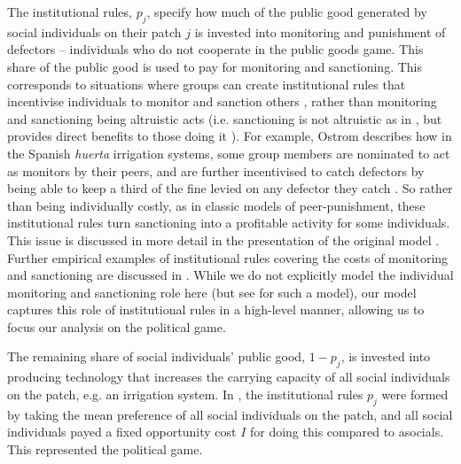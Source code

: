 \documentclass{rstb}
\begin{document}
\begin{linenumbers}
The institutional rules, $p_j$, specify how much of the public good generated by social individuals on their patch $j$ is invested into monitoring and punishment of defectors -- individuals who do not cooperate in the public goods game. This share of the public good is used to pay for monitoring and sanctioning. This corresponds to situations where groups can create institutional rules that incentivise individuals to monitor and sanction others \cite{Baumard:2010:a}, rather than monitoring and sanctioning being altruistic acts (i.e. sanctioning is not altruistic as in \cite{Boyd:2003:a}, but provides direct benefits to those doing it \cite{Powers:2016:a,Powers:2021:a}). For example, Ostrom describes how in the Spanish \textit{huerta} irrigation systems, some group members are nominated to act as monitors by their peers, and are further incentivised to catch defectors by being able to keep a third of the fine levied on any defector they catch \cite{Ostrom:1990:a}. So rather than being individually costly, as in classic models of peer-punishment, these institutional rules turn sanctioning into a profitable activity for some individuals. This issue is discussed in more detail in the presentation of the original model \cite{Powers:2013:a}. Further empirical examples of institutional rules covering the costs of monitoring and sanctioning are discussed in \cite{Guala:2012:a}. While we do not explicitly model the individual monitoring and sanctioning role here (but see \cite{Powers:2018:b} for such a model), our model captures this role of institutional rules in a high-level manner, allowing us to focus our analysis on the political game.

The remaining share of social individuals' public good, $1-p_j$, is invested into producing technology that increases the carrying capacity of all social individuals on the patch, e.g. an irrigation system. In \cite{Powers:2013:a}, the institutional rules $p_j$ were formed by taking the mean preference of all social individuals on the patch, and all social individuals payed a fixed opportunity cost $I$ for doing this compared to asocials. This represented the political game. 


\end{linenumbers}
\end{document}

